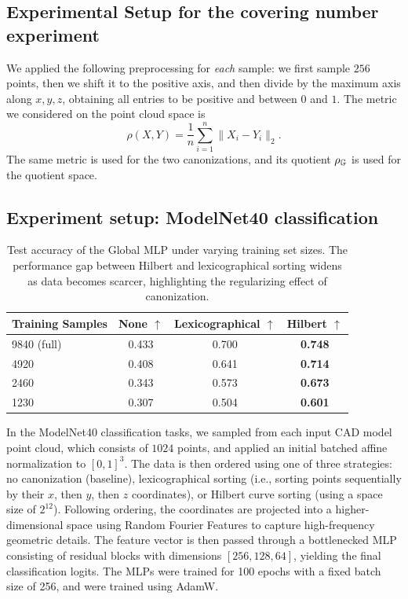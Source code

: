 \documentclass{article}
\begin{document}
\subsection{Experimental Setup for the covering number experiment}
We applied the following preprocessing for \emph{each} sample: we first sample $256$ points, then we shift it to the positive axis, and then divide by the maximum axis along $x,y,z$, obtaining all entries to be positive and between $0$ and $1$. The metric we considered on the point cloud space is 
$$\rho(X,Y) = \frac{1}{n}\sum^{n}_{i=1}\|X_i-Y_i\|_2 .$$
The same metric is used for the two canonizations, and its quotient $\rho_{\mathbb{G}}$ is used for the quotient space. 

\subsection{Experiment setup: ModelNet40 classification}
\begin{table}[ht]
\centering
\caption{Test accuracy of the Global MLP under varying training set sizes. The performance gap between Hilbert and lexicographical sorting widens as data becomes scarcer, highlighting the regularizing effect of canonization.}
\label{tab:data_scarcity}
\begin{tabular}{lccc}
\toprule
\textbf{Training Samples} & \textbf{None} $\uparrow$ & \textbf{Lexicographical} $\uparrow$ & \textbf{Hilbert} $\uparrow$ \\
\midrule
9840 (full) & 0.433 & 0.700 & \textbf{0.748} \\
4920 & 0.408 & 0.641 & \textbf{0.714} \\
2460 & 0.343 & 0.573 & \textbf{0.673} \\
1230 & 0.307 & 0.504 & \textbf{0.601} \\
\bottomrule
\end{tabular}
\end{table}
In the ModelNet40 classification tasks, we sampled from each input CAD model point cloud, which consists of $1024$ points, and applied an initial batched affine normalization to $[0, 1]^3$. The data is then ordered using one of three strategies: no canonization (baseline), lexicographical sorting (i.e., sorting points sequentially by their $x$, then $y$, then $z$ coordinates), or Hilbert curve sorting (using a space size of $2^{12}$). Following ordering, the coordinates are projected into a higher-dimensional space using Random Fourier Features to capture high-frequency geometric details. The feature vector is then passed through a bottlenecked MLP consisting of residual blocks with dimensions $[256, 128, 64]$, yielding the final classification logits. The MLPs were trained for 100 epochs with a fixed batch size of 256, and were trained using AdamW.
\end{document}
